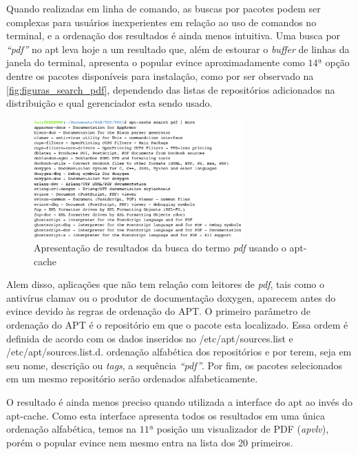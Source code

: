 
Quando realizadas em linha de comando, as buscas por pacotes podem ser complexas para usuários inexperientes em relação ao uso de comandos no terminal, e a ordenação dos resultados é ainda menos intuitiva. Uma busca por \textit{``pdf''} no {\code apt} leva hoje a um resultado que, além de estourar o \textit{buffer} de linhas da janela do terminal, apresenta o popular {\code evince} aproximadamente como $14ª$ opção dentre os  pacotes disponíveis para instalação, como por ser observado na \autoref{fig:figuras_search_pdf}, dependendo das listas de repositórios adicionados na distribuição e qual gerenciador esta sendo usado.

\begin{figure}[h]
  \centering
	\includegraphics[width=0.72\textwidth]{figuras/search_pdf}
  \caption{Apresentação de resultados da busca do termo \textit{pdf} usando o {\code apt-cache}}
  \label{fig:figuras_search_pdf}
\end{figure}

Alem disso, aplicações que não tem relação com leitores de \textit{pdf}, tais como o antivírus {\code clamav} ou o produtor de documentação {\code doxygen}, aparecem antes do {\code evince} devido às regras de ordenação do APT. O primeiro parâmetro de ordenação do APT é o repositório em que o pacote esta localizado. Essa ordem é definida de acordo com os dados inseridos no {\code /etc/apt/sources.list} e {\code /etc/apt/sources.list.d}.  ordenação alfabética dos repositórios e por terem, seja em seu nome, descrição ou \textit{tags}, a sequência \textit{``pdf''}. Por fim, os pacotes selecionados em um mesmo repositório serão ordenados alfabeticamente.

O resultado é ainda menos preciso quando utilizada a interface do {\code apt} ao invés do {\code apt-cache}. Como esta interface apresenta todos os resultados em uma única ordenação alfabética, temos na $11ª$ posição um visualizador de PDF (\textit{apvlv}), porém o popular {\code evince} nem mesmo entra na lista dos 20 primeiros.

